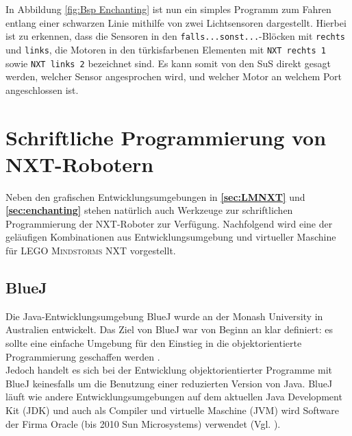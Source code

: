 \documentclass[paper=a4, pagesize, DIV=calc, BCOR=15mm, twoside=on, onecolumn=on, open = right, titlepage =on, parskip =half-, headsepline = on, footsepline = on, chapterprefix = on, appendixprefix = off, fontsize = 12pt, numbers = noenddot, abstract = on]{scrbook}
\numberwithin{equation}{chapter}
\theoremstyle{definition}
\theoremstyle{plain}
\theoremstyle{plain}
\theoremstyle{remark}
\theoremstyle{plain}
\theoremstyle{plain}
\begin{document}
In Abbildung \ref{fig:Bsp Enchanting} ist nun ein simples Programm zum Fahren entlang einer schwarzen Linie mithilfe von zwei Lichtsensoren dargestellt. Hierbei ist zu erkennen, dass die Sensoren in den \texttt{falls...sonst...}-Blöcken mit \texttt{rechts} und \texttt{links}, die Motoren in den türkisfarbenen Elementen mit \texttt{NXT rechts 1} sowie \texttt{NXT links 2} bezeichnet sind. Es kann somit von den SuS direkt gesagt werden, welcher Sensor angesprochen wird, und welcher Motor an welchem Port angeschlossen ist.

\section{Schriftliche Programmierung von NXT-Robotern}
\label{sec:bluejetc}
Neben den grafischen Entwicklungsumgebungen in \textbf{\ref{sec:LMNXT}} und \textbf{\ref{sec:enchanting}} stehen natürlich auch Werkzeuge zur schriftlichen Programmierung der NXT-Roboter zur Verfügung. Nachfolgend wird eine der geläufigen Kombinationen aus Entwicklungsumgebung und virtueller Maschine für \textsc{LEGO Mindstorms} NXT vorgestellt. 

\subsection{BlueJ}
\label{sec:bluej}
Die Java-Entwicklungsumgebung BlueJ wurde an der Monash University in Australien entwickelt. Das Ziel von BlueJ war von Beginn an klar definiert: es sollte eine einfache Umgebung für den Einstieg in die objektorientierte Programmierung geschaffen werden \cite[S.14]{barnes:03}.\\
Jedoch handelt es sich bei der Entwicklung objektorientierter Programme mit BlueJ keinesfalls um die Benutzung einer reduzierten Version von Java. BlueJ läuft wie andere Entwicklungsumgebungen auf dem aktuellen Java Development Kit (JDK) und auch als Compiler und virtuelle Maschine (JVM) wird Software der Firma Oracle (bis 2010 Sun Microsystems) verwendet (Vgl. \cite[S.15]{barnes:03}).
\end{document}
